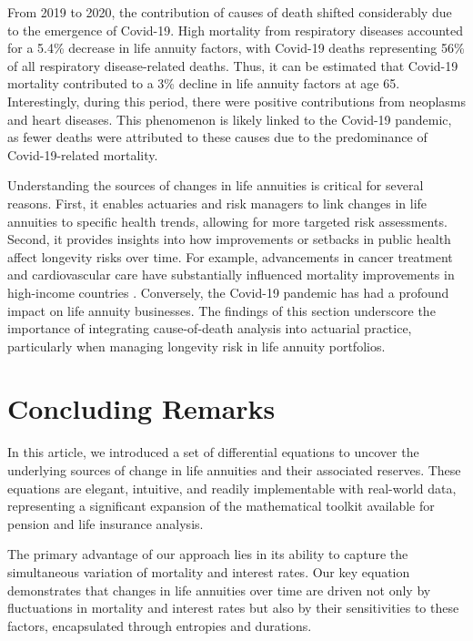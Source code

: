 \documentclass[12pt]{article}
\begin{document}
From 2019 to 2020, the contribution of causes of death shifted considerably due to the emergence of Covid-19. High mortality from respiratory diseases accounted for a 5.4\% decrease in life annuity factors, with Covid-19 deaths representing 56\% of all respiratory disease-related deaths. Thus, it can be estimated that Covid-19 mortality contributed to a 3\% decline in life annuity factors at age 65. Interestingly, during this period, there were positive contributions from neoplasms and heart diseases. This phenomenon is likely linked to the Covid-19 pandemic, as fewer deaths were attributed to these causes due to the predominance of Covid-19-related mortality.

Understanding the sources of changes in life annuities is critical for several reasons. First, it enables actuaries and risk managers to link changes in life annuities to specific health trends, allowing for more targeted risk assessments. Second, it provides insights into how improvements or setbacks in public health affect longevity risks over time. For example, advancements in cancer treatment and cardiovascular care have substantially influenced mortality improvements in high-income countries \citep{weber2023gains}. Conversely, the Covid-19 pandemic has had a profound impact on life annuity businesses. The findings of this section underscore the importance of integrating cause-of-death analysis into actuarial practice, particularly when managing longevity risk in life annuity portfolios.

\section{Concluding Remarks}\label{sec:6_Conclusion}

In this article, we introduced a set of differential equations to uncover the underlying sources of change in life annuities and their associated reserves. These equations are elegant, intuitive, and readily implementable with real-world data, representing a significant expansion of the mathematical toolkit available for pension and life insurance analysis.

The primary advantage of our approach lies in its ability to capture the simultaneous variation of mortality and interest rates. Our key equation demonstrates that changes in life annuities over time are driven not only by fluctuations in mortality and interest rates but also by their sensitivities to these factors, encapsulated through entropies and durations.
\end{document}
